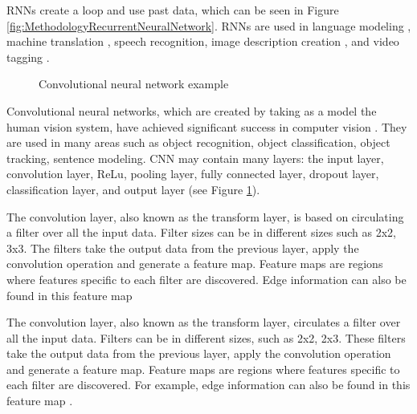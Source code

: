 RNNs create a loop and use past data, which can be seen in Figure \ref{fig:MethodologyRecurrentNeuralNetwork}. RNNs are used in language modeling \cite{mikolov2011extensions}, machine translation \cite{cho2014learning}, speech recognition\cite{miao2015eesen}, image description creation \cite{mao2014deep}, and video tagging \cite{garg2021video}. 

\begin{figure}[htbp]
\centering
{}
\caption{Convolutional neural network example \cite{ferracuti2019business}}
\label{fig:MethodologyConvolutionalNeuralNetworkExample}
\end{figure}

Convolutional neural networks, which are created by taking as a model the human vision system, have achieved significant success in computer vision \cite{gu2018recent, bouvrie2006notes, lavin2016fast}. They are used in many areas such as object recognition, object classification, object tracking, sentence modeling. CNN may contain many layers: the input layer, convolution layer, ReLu, pooling layer, fully connected layer, dropout layer, classification layer, and output layer (see Figure \ref{fig:MethodologyConvolutionalNeuralNetworkExample}).

The convolution layer, also known as the transform layer, is based on circulating a filter over all the input data. Filter sizes can be in different sizes such as 2x2, 3x3. The filters take the output data from the previous layer, apply the convolution operation and generate a feature map. Feature maps are regions where features specific to each filter are discovered. Edge information can also be found in this feature map \cite{goodfellow2016deep}

The convolution layer, also known as the transform layer, circulates a filter over all the input data. Filters can be in different sizes, such as 2x2, 2x3. These filters take the output data from the previous layer, apply the convolution operation and generate a feature map. Feature maps are regions where features specific to each filter are discovered. For example, edge information can also be found in this feature map \cite{goodfellow2016deep}.

